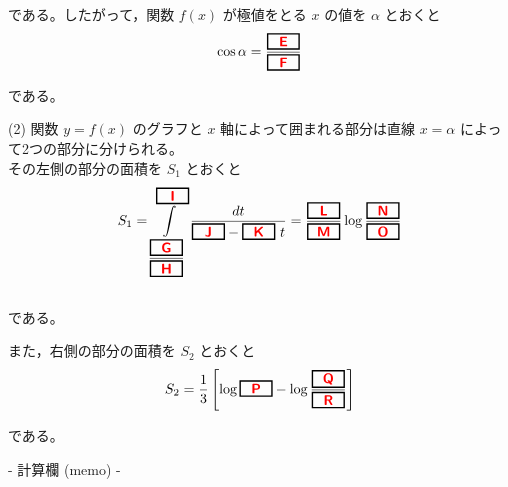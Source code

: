 \documentclass[dvipdfmx,twoside]{jsarticle}
\newcommand{\ab}[1]{%
\begin{tikzpicture}[baseline]
\node[draw=black, 
      rectangle, 
      minimum width=0.8cm, 
      minimum height=0.3cm, 
      font=\bfseries,
      line width=1pt,
      inner sep=2pt,
      anchor=base] {#1};
\end{tikzpicture}%
}
\begin{document}
\begin{CJK}{UTF8}{ipxm}
である。したがって，関数 $f(x)$ が極値をとる $x$ の値を $\alpha$ とおくと
\begin{align*}
\cos \alpha = \dfrac{\ab{\textsf{\color{red}E}}}{\ab{\textsf{\color{red}F}}}
\end{align*}

である。

\vspace{2em}

\noindent
(2) \quad 関数 $y = f(x)$ のグラフと $x$ 軸によって囲まれる部分は直線 $x = \alpha$ によって2つの部分に分けられる。\\[0.5em]

\qquad その左側の部分の面積を $S_1$ とおくと\\

\begin{align*}
S_1 = \displaystyle\int\limits_{\dfrac{\ab{\textsf{\color{red}G}}}{\ab{\textsf{\color{red}H}}}}^{\ab{\textsf{\color{red}I}}} \dfrac{dt}{\ab{\textsf{\color{red}J}} - \ab{\textsf{\color{red}K}}\ t} = \dfrac{\ab{\textsf{\color{red}L}}}{\ab{\textsf{\color{red}M}}} \log \dfrac{\ab{\textsf{\color{red}N}}}{\ab{\textsf{\color{red}O}}}
\end{align*}
\\

である。

\vspace{1em}

また，右側の部分の面積を $S_2$ とおくと
\begin{align*}
S_2 = \dfrac{1}{3}\left[\log \ab{\textsf{\color{red}P}}  - \log \dfrac{\ab{\textsf{\color{red}Q}}}{\ab{\textsf{\color{red}R}}}\right]
\end{align*}

である。
\newpage
\begin{center}
- 計算欄 (memo) -
\end{center}

\end{CJK}
\end{document}
